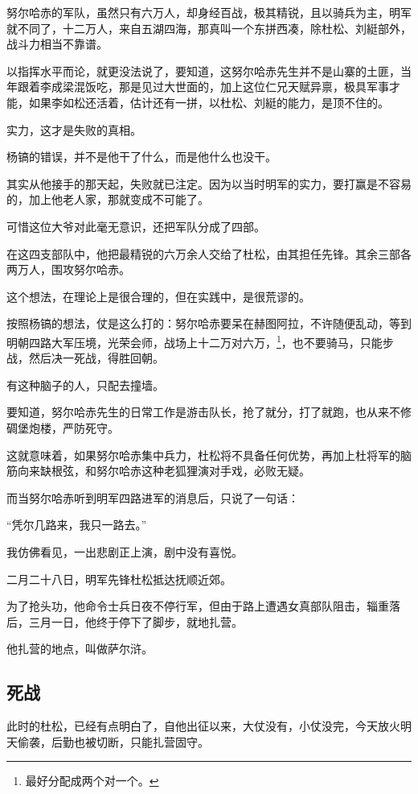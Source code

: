 \begin{multicols}{\theparacolNo}
		努尔哈赤的军队，虽然只有六万人，却身经百战，极其精锐，且以骑兵为主，明军就不同了，十二万人，来自五湖四海，那真叫一个东拼西凑，除杜松、刘綎部外，战斗力相当不靠谱。

		以指挥水平而论，就更没法说了，要知道，这努尔哈赤先生并不是山寨的土匪，当年跟着李成梁混饭吃，那是见过大世面的，加上这位仁兄天赋异禀，极具军事才能，如果李如松还活着，估计还有一拼，以杜松、刘綎的能力，是顶不住的。

		实力，这才是失败的真相。

		杨镐的错误，并不是他干了什么，而是他什么也没干。

		其实从他接手的那天起，失败就已注定。因为以当时明军的实力，要打赢是不容易的，加上他老人家，那就变成不可能了。

		可惜这位大爷对此毫无意识，还把军队分成了四部。

		在这四支部队中，他把最精锐的六万余人交给了杜松，由其担任先锋。其余三部各两万人，围攻努尔哈赤。

		这个想法，在理论上是很合理的，但在实践中，是很荒谬的。

		按照杨镐的想法，仗是这么打的：努尔哈赤要呆在赫图阿拉，不许随便乱动，等到明朝四路大军压境，光荣会师，战场上十二万对六万，\footnote{最好分配成两个对一个。}，也不要骑马，只能步战，然后决一死战，得胜回朝。

		有这种脑子的人，只配去撞墙。

		要知道，努尔哈赤先生的日常工作是游击队长，抢了就分，打了就跑，也从来不修碉堡炮楼，严防死守。

		这就意味着，如果努尔哈赤集中兵力，杜松将不具备任何优势，再加上杜将军的脑筋向来缺根弦，和努尔哈赤这种老狐狸演对手戏，必败无疑。

		而当努尔哈赤听到明军四路进军的消息后，只说了一句话：

		“凭尔几路来，我只一路去。”

		我仿佛看见，一出悲剧正上演，剧中没有喜悦。

		二月二十八日，明军先锋杜松抵达抚顺近郊。

		为了抢头功，他命令士兵日夜不停行军，但由于路上遭遇女真部队阻击，辎重落后，三月一日，他终于停下了脚步，就地扎营。

		他扎营的地点，叫做萨尔浒。

		\subsection{死战}
		此时的杜松，已经有点明白了，自他出征以来，大仗没有，小仗没完，今天放火明天偷袭，后勤也被切断，只能扎营固守。


\end{multicols}
